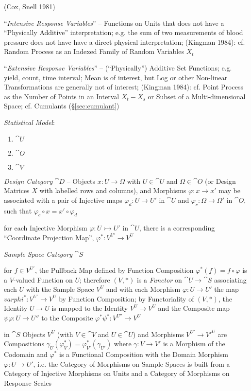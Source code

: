 (Cox, Snell 1981)

``\emph{Intensive Response Variables}'' -- Functions on Units that does not have
a ``Physically Additive'' interpretation; e.g. the sum of two measurements of
blood pressure does not have have a direct physical interpretation;
(Kingman 1984): cf. Random Process as an Indexed Family of Random Variables
$X_t$

``\emph{Extensive Response Variables}'' -- (``Physically'') Additive Set
Functions; e.g. yield, count, time interval; Mean is of interest, but Log
or other Non-linear Transformations are generally not of interest;
(Kingman 1984): cf. Point Process as the Number of Points in an Interval
$X_t - X_s$ or Subset of a Multi-dimensional Space; cf. Cumulants
(\S\ref{sec:cumulant})

\emph{Statistical Model}:
\begin{enumerate}
  \item $\cat{U}$
  \item $\cat{O}$
  \item $\cat{V}$
\end{enumerate}

\emph{Design Category} $\cat{D}$ -- Objects $x : U \to \Omega$ with
$U \in \cat{U}$ and $\Omega \in \cat{O}$ (or Design Matrices $X$ with labelled
rows and columns), and Morphisms $\varphi : x \to x'$ may be associated with a
pair of Injective maps $\varphi_d : U \to U'$ in $\cat{U}$ and
$\varphi_c : \Omega \to \Omega'$ in $\cat{O}$, such that
$\varphi_c \circ x = x' \circ \varphi_d$

for each Injective Morphism $\varphi : U \rightarrowtail U'$ in $\cat{U}$, there
is a corresponding ``Coordinate Projection Map'', $\varphi^* : V^{U'} \to V^{U}$

\emph{Sample Space Category} $\cat{S}$

for $f \in V^{U'}$, the Pullback Map defined by Function Composition
$\varphi^* (f) = f \circ \varphi$ is a $V$-valued Function on $U$; therefore
$(V, *)$ is a \emph{Functor} on $\cat{U} \to \cat{S}$ associating each $U$ with
the Sample Space $V^U$ and with each Morphism $\varphi : U \to U'$ the map
$varphi^* : V^{U'} \to V^U$ by Function Composition; by Functoriality of
$(V, *)$, the Identity $U \to U$ is mapped to the Identity $V^U \to V^U$ and the
Composite map $\psi\varphi : U \to U''$ to the Composite
$\varphi^*\psi^* : V^{U''} \to V^U$

in $\cat{S}$ Objects $V^U$ (with $V \in \cat{V}$
and $U \in \cat{U}$) and Morphisms $V^{U'} \to V'^{U}$ are Compositions
$\gamma_U(\varphi_V^*) = \varphi_{V'}^*(\gamma_{U'})$ where $\gamma : V \to V'$
is a Morphism of the Codomain and $\varphi^*$ is a  Functional Composition with
the Domain Morphism $\varphi : U \to U'$, i.e. the Category of Morphisms on
Sample Spaces is built from a Category of Injective Morphisms on Units and a
Category of Morphisms on Response Scales

